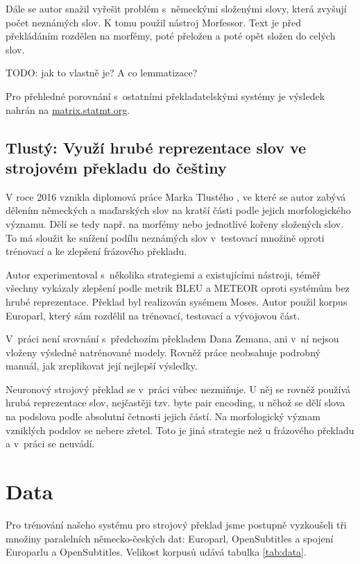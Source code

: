 \documentclass[a4]{article}
\begin{document}
Dále se autor snažil vyřešit problém s~německými složenými slovy, která
zvyšují počet neznámých slov. K tomu použil nástroj
Morfessor\cite{morfessor}. Text je před překládáním rozdělen na morfémy,
poté přeložen a poté opět složen do celých slov.

TODO: jak to vlastně je? A co lemmatizace?

Pro přehledné porovnání s~ostatními překladatelskými systémy je výsledek
nahrán na \url{matrix.statmt.org}.

\subsection{Tlustý: Využí hrubé reprezentace slov ve strojovém
překladu do češtiny}

V roce 2016 vznikla diplomová práce Marka Tlustého \cite{tlusty}, ve které se autor
zabývá dělením německých a maďarských slov na kratší části podle jejich
morfologického významu. Dělí se tedy např. na morfémy nebo jednotlivé kořeny
složených slov. To má sloužit ke snížení podílu neznámých slov v~testovací
množině oproti trénovací a ke zlepšení frázového překladu. 

Autor experimentoval s~několika strategiemi a existujícími nástroji, téměř
všechny vykázaly zlepšení podle metrik BLEU a METEOR oproti systémům bez
hrubé reprezentace.  Překlad byl realizován sysémem Moses. Autor použil
korpus Europarl\cite{europarl}, který sám rozdělil na trénovací, testovací a vývojovou
část. 

V~práci není srovnání s~předchozím překladem Dana Zemana, ani v~ní nejsou
vloženy výsledné natrénované modely. Rovněž práce neobsahuje podrobný manuál, jak
zreplikovat její nejlepší výsledky.

Neuronový strojový překlad se v~práci vůbec nezmiňuje. 
U něj se rovněž používá hrubá reprezentace slov, nejčastěji
tzv. byte pair encoding, u něhož se dělí slova na podslova podle absolutní četnosti jejich
částí. Na morfologický význam vzniklých podslov se nebere zřetel. Toto je
jiná strategie než u frázového překladu a v~práci se neuvádí. 



\section{Data}

Pro trénování našeho systému pro strojový překlad jsme postupně vyzkoušeli tři množiny
paralelních německo-českých dat: Europarl, OpenSubtitles a spojení Europarlu
a OpenSubtitles. Velikost korpusů udává tabulka \ref{tab:data}.
\end{document}
